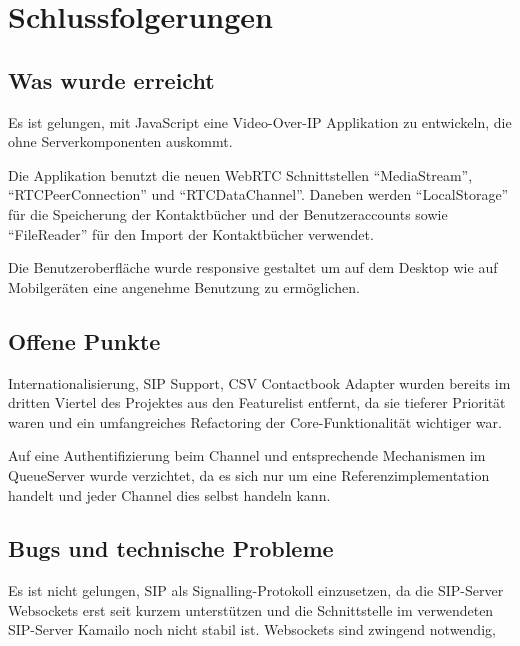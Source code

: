 \chapter{Schlussfolgerungen}
	\section{Was wurde erreicht}
	Es ist gelungen, mit JavaScript eine Video-Over-IP Applikation zu entwickeln, die ohne Serverkomponenten auskommt.
	
	Die Applikation benutzt die neuen WebRTC Schnittstellen ``MediaStream'', ``RTCPeerConnection'' und ``RTCDataChannel''. Daneben werden ``LocalStorage'' für die Speicherung der Kontaktbücher und der Benutzeraccounts sowie ``FileReader'' für den Import der Kontaktbücher verwendet.
	
	Die Benutzeroberfläche wurde responsive gestaltet um auf dem Desktop wie auf Mobilgeräten eine angenehme Benutzung zu ermöglichen.
	
	
	\section{Offene Punkte}
	Internationalisierung, SIP Support, CSV Contactbook Adapter wurden bereits im dritten Viertel des Projektes aus den Featurelist entfernt, da sie tieferer Priorität waren und ein umfangreiches Refactoring der Core-Funktionalität wichtiger war.
	
	Auf eine Authentifizierung beim Channel und entsprechende Mechanismen im QueueServer wurde verzichtet, da es sich nur um eine Referenzimplementation handelt und jeder Channel dies selbst handeln kann.
	
	\section{Bugs und technische Probleme}
	Es ist nicht gelungen, SIP als Signalling-Protokoll einzusetzen, da die SIP-Server Websockets erst seit kurzem unterstützen und die Schnittstelle im verwendeten SIP-Server Kamailo noch nicht stabil ist. Websockets sind zwingend notwendig, 